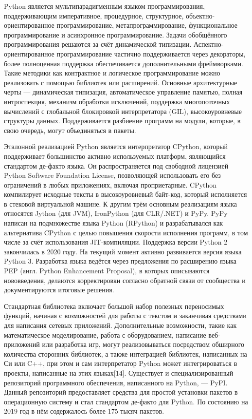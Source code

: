 Python является мультипарадигменным языком программирования, поддерживающим императивное, процедурное, структурное, объектно-ориентированное программирование, метапрограммирование, функциональное программирование и асинхронное программирование. Задачи обобщённого программирования решаются за счёт динамической типизации. Аспектно-ориентированное программирование частично поддерживается через декораторы, более полноценная поддержка обеспечивается дополнительными фреймворками. Такие методики как контрактное и логическое программирование можно реализовать с помощью библиотек или расширений. Основные архитектурные черты — динамическая типизация, автоматическое управление памятью, полная интроспекция, механизм обработки исключений, поддержка многопоточных вычислений с глобальной блокировкой интерпретатора (GIL), высокоуровневые структуры данных. Поддерживается разбиение программ на модули, которые, в свою очередь, могут объединяться в пакеты.

Эталонной реализацией Python является интерпретатор CPython, который поддерживает большинство активно используемых платформ, являющийся стандартом де-факто языка. Он распространяется под свободной лицензией Python Software Foundation License, позволяющей использовать его без ограничений в любых приложениях, включая проприетарные. CPython компилирует исходные тексты в высокоуровневый байт-код, который исполняется в стековой виртуальной машине. К другим трём основным реализациям языка относятся Jython (для JVM), IronPython (для CLR/.NET) и PyPy. PyPy написан на подмножестве языка Python (RPython) и разрабатывался как альтернатива CPython с целью повышения скорости исполнения программ, в том числе за счёт использования JIT-компиляции. Поддержка версии Python 2 закончилась в 2020 году. На текущий момент активно развивается версия языка Python 3. Разработка языка ведётся через предложения по расширению языка PEP (англ. Python Enhancement Proposal), в которых описываются нововведения, делаются корректировки согласно обратной связи от сообщества и документируются итоговые решения.

Стандартная библиотека включает большой набор полезных переносимых функций, начиная с возможностей для работы с текстом и заканчивая средствами для написания сетевых приложений. Дополнительные возможности, такие как математическое моделирование, работа с оборудованием, написание веб-приложений или разработка игр, могут реализовываться посредством обширного количества сторонних библиотек, а также интеграцией библиотек, написанных на Си или C++, при этом и сам интерпретатор Python может интегрироваться в проекты, написанные на этих языках[14]. Существует и специализированный репозиторий программного обеспечения, написанного на Python, — PyPI. Данный репозиторий предоставляет средства для простой установки пакетов в операционную систему и стал стандартом де-факто для Python. По состоянию на 2019 год в нём содержалось более 175 тысяч пакетов.

